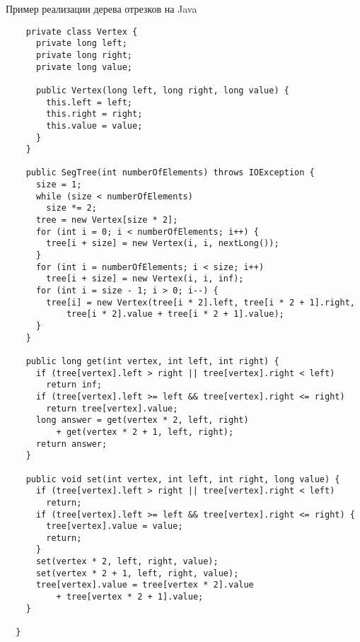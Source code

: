 \begin{section}{Пример реализации дерева отрезков на Java}
\begin{lstlisting}
    private class Vertex {
      private long left;
      private long right;
      private long value;

      public Vertex(long left, long right, long value) {
        this.left = left;
        this.right = right;
        this.value = value;
      }
    }

    public SegTree(int numberOfElements) throws IOException {
      size = 1;
      while (size < numberOfElements)
        size *= 2;
      tree = new Vertex[size * 2];
      for (int i = 0; i < numberOfElements; i++) {
        tree[i + size] = new Vertex(i, i, nextLong());
      }
      for (int i = numberOfElements; i < size; i++)
        tree[i + size] = new Vertex(i, i, inf);
      for (int i = size - 1; i > 0; i--) {
        tree[i] = new Vertex(tree[i * 2].left, tree[i * 2 + 1].right,
            tree[i * 2].value + tree[i * 2 + 1].value);
      }
    }

    public long get(int vertex, int left, int right) {
      if (tree[vertex].left > right || tree[vertex].right < left)
        return inf;
      if (tree[vertex].left >= left && tree[vertex].right <= right)
        return tree[vertex].value;
      long answer = get(vertex * 2, left, right)
          + get(vertex * 2 + 1, left, right);
      return answer;
    }

    public void set(int vertex, int left, int right, long value) {
      if (tree[vertex].left > right || tree[vertex].right < left)
        return;
      if (tree[vertex].left >= left && tree[vertex].right <= right) {
        tree[vertex].value = value;
        return;
      }
      set(vertex * 2, left, right, value);
      set(vertex * 2 + 1, left, right, value);
      tree[vertex].value = tree[vertex * 2].value
          + tree[vertex * 2 + 1].value;
    }

  }


\end{lstlisting}

\end{section}